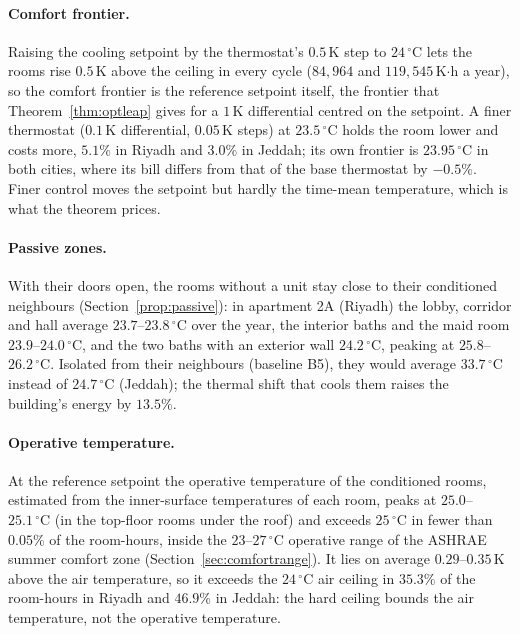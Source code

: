 \documentclass[10pt,a4paper,twocolumn]{article}
\theoremstyle{definition}
\begin{document}
\paragraph{Comfort frontier.}\label{sec:frontier} Raising the cooling setpoint by the thermostat's $0.5\,$K step to $24\,^{\circ}$C lets the rooms rise $0.5\,$K above the ceiling in every cycle ($84{,}964$ and $119{,}545\,$K$\cdot$h a year), so the comfort frontier is the reference setpoint itself, the frontier that Theorem~\ref{thm:optleap} gives for a $1\,$K differential centred on the setpoint. A finer thermostat ($0.1\,$K differential, $0.05\,$K steps) at $23.5\,^{\circ}$C holds the room lower and costs more, $5.1\%$ in Riyadh and $3.0\%$ in Jeddah; its own frontier is $23.95\,^{\circ}\mathrm{C}$ in both cities, where its bill differs from that of the base thermostat by $-0.5\%$. Finer control moves the setpoint but hardly the time-mean temperature, which is what the theorem prices.

\paragraph{Passive zones.} With their doors open, the rooms without a unit stay close to their conditioned neighbours (Section~\ref{prop:passive}): in apartment 2A (Riyadh) the lobby, corridor and hall average $23.7$--$23.8\,^{\circ}\mathrm{C}$ over the year, the interior baths and the maid room $23.9$--$24.0\,^{\circ}\mathrm{C}$, and the two baths with an exterior wall $24.2\,^{\circ}\mathrm{C}$, peaking at $25.8$--$26.2\,^{\circ}\mathrm{C}$. Isolated from their neighbours (baseline B5), they would average $33.7\,^{\circ}$C instead of $24.7\,^{\circ}$C (Jeddah); the thermal shift that cools them raises the building's energy by $13.5\%$.

\paragraph{Operative temperature.}\label{sec:operative} At the reference setpoint the operative temperature of the conditioned rooms, estimated from the inner-surface temperatures of each room, peaks at $25.0$--$25.1\,^{\circ}\mathrm{C}$ (in the top-floor rooms under the roof) and exceeds $25\,^{\circ}$C in fewer than $0.05\%$ of the room-hours, inside the $23$--$27\,^{\circ}$C operative range of the ASHRAE summer comfort zone (Section~\ref{sec:comfortrange}). It lies on average $0.29$--$0.35$\,K above the air temperature, so it exceeds the $24\,^{\circ}$C air ceiling in $35.3\%$ of the room-hours in Riyadh and $46.9\%$ in Jeddah: the hard ceiling bounds the air temperature, not the operative temperature.
\end{document}
